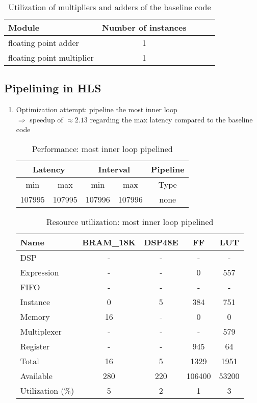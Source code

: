\documentclass{article}
\begin{document}
\begin{table}[H]
	\centering
	\begin{tabular}{lcccc}
		Module & Number of instances \\
		\hline
		floating point adder & 1 \\
		floating point multiplier & 1
	\end{tabular}
	\caption{Utilization of multipliers and adders of the baseline code}
	\label{1-a-resources-arithmetic}
\end{table}


\subsection{Pipelining in HLS}
\label{1-b}
\begin{enumerate}
	\item Optimization attempt: pipeline the most inner loop \\
		$\Rightarrow$ speedup of $\approx 2.13$ regarding the max latency compared to the baseline code
	\begin{table}[H]
		\centering
		\begin{tabular}{ccccc}
			\multicolumn{2}{c}{Latency} & \multicolumn{2}{c}{Interval} & Pipeline\\
			\hline
			min  &   max  &   min  &   max  &   Type  \\
			107995&  107995&  107996&  107996&   none  
		\end{tabular}
		\caption{Performance: most inner loop pipelined}
		\label{1-b-perf-table-1}
	\end{table}

	\begin{table}[H]
	\centering
	\begin{tabular}{lcccc}
		Name      & BRAM\_18K& DSP48E&   FF   &  LUT  \\
		\hline
		DSP              &        -&      -&       -&      -\\
		Expression       &        -&      -&       0&    557\\
		FIFO             &        -&      -&       -&      -\\
		Instance         &        0&      5&     384&    751\\
		Memory           &       16&      -&       0&      0\\
		Multiplexer      &        -&      -&       -&    579\\
		Register         &        -&      -&     945&     64\\
		\hline
		Total            &       16&      5&    1329&   1951\\
		Available        &      280&    220&  106400&  53200\\
		\hline
		Utilization ($\%$)  &        5&      2&       1&      3
	\end{tabular}
	\caption{Resource utilization: most inner loop pipelined}
	\label{1-b-resources-1}
	\end{table}


\end{enumerate}
\end{document}
